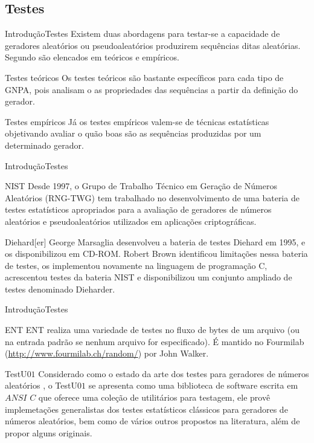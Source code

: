 \documentclass[10pt,xcolor={dvipsnames}]{beamer}
\begin{document}
\subsection{Testes}
\begin{frame}{Introdução}{Testes}
Existem duas abordagens para testar-se a capacidade de geradores aleatórios ou pseudoaleatórios produzirem sequências ditas aleatórias.
Segundo \cite{LEcuyer:92} são elencados em teóricos e empíricos.
\pause
\begin{block}{Testes teóricos}
	Os testes teóricos são bastante específicos para cada tipo de GNPA, pois analisam o as propriedades das sequências a partir da definição do gerador.
\end{block}
\pause
\begin{block}{Testes empíricos}
	Já os testes empíricos valem-se de técnicas estatísticas objetivando avaliar o quão boas são as sequências produzidas por um determinado gerador.
\end{block}	
\end{frame}

\begin{frame}{Introdução}{Testes}
\pause
\begin{block}{NIST}
	Desde 1997, o Grupo de Trabalho Técnico em Geração de Números Aleatórios (RNG-TWG) tem trabalhado no desenvolvimento de uma bateria de testes estatísticos apropriados para a avaliação de geradores de números aleatórios e pseudoaleatórios utilizados em aplicações criptográficas.
\end{block}
\pause
\begin{block}{Diehard[er]}
	George Marsaglia desenvolveu a bateria de testes Diehard em 1995, e os disponibilizou em CD-ROM.
	Robert Brown identificou limitações nessa bateria de testes, os implementou novamente na linguagem de programação C, acrescentou testes da bateria NIST e disponibilizou um conjunto ampliado de testes denominado Dieharder.
\end{block}	
\end{frame}

\begin{frame}{Introdução}{Testes}
\pause
\begin{block}{ENT}
	ENT \cite{ENTTestSuite} realiza uma variedade de testes no fluxo de bytes de um arquivo (ou na entrada padrão se nenhum arquivo for especificado). É mantido no Fourmilab (\url{http://www.fourmilab.ch/random/}) por John Walker.
\end{block}
\pause
\begin{block}{TestU$01$}
	Considerado como o estado da arte dos testes para geradores de números aleatórios \citep{LEcuyer:07}, o TestU$01$ se apresenta como uma biblioteca de software escrita em $ANSI$ $C$ que oferece uma coleção de utilitários para testagem, ele provê implemetações generalistas dos testes estatísticos clássicos para geradores de números aleatórios, bem como de vários outros propostos na literatura, além de propor alguns originais.
\end{block}	
\end{frame}
\end{document}
